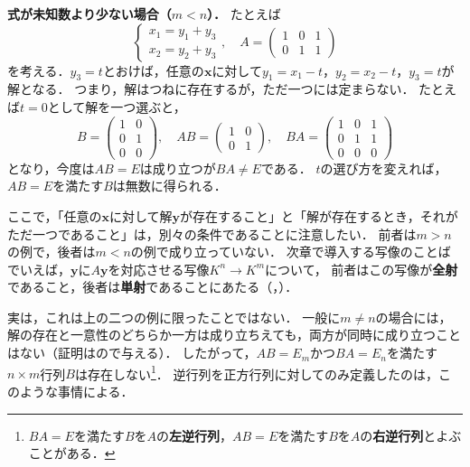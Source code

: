 \begin{remark}[係数行列が正方行列でない場合]
  \textbf{式が未知数より少ない場合（$m < n$）．}
  たとえば
  \[
    \begin{cases}
      x_1 = y_1 + y_3 \\
      x_2 = y_2 + y_3
    \end{cases}, \quad
    A = \begin{pmatrix} 1 & 0 & 1 \\ 0 & 1 & 1 \end{pmatrix}
  \]
  を考える．$y_3 = t$とおけば，任意の$\bm{x}$に対して$y_1 = x_1 - t$，$y_2 = x_2 - t$，$y_3 = t$が解となる．
  つまり，解はつねに存在するが，ただ一つには定まらない．
  たとえば$t = 0$として解を一つ選ぶと，
  \[
    B = \begin{pmatrix} 1 & 0 \\ 0 & 1 \\ 0 & 0 \end{pmatrix}, \quad
    AB = \begin{pmatrix} 1 & 0 \\ 0 & 1 \end{pmatrix}, \quad
    BA = \begin{pmatrix} 1 & 0 & 1 \\ 0 & 1 & 1 \\ 0 & 0 & 0 \end{pmatrix}
  \]
  となり，今度は$AB = E$は成り立つが$BA \ne E$である．
  $t$の選び方を変えれば，$AB = E$を満たす$B$は無数に得られる．

  ここで，「任意の$\bm{x}$に対して解$\bm{y}$が存在すること」と「解が存在するとき，それがただ一つであること」は，別々の条件であることに注意したい．
  前者は$m > n$の例で，後者は$m < n$の例で成り立っていない．
  次章で導入する写像のことばでいえば，$\bm{y}$に$A\bm{y}$を対応させる写像$K^n \to K^m$について，
  前者はこの写像が\textbf{全射}であること，後者は\textbf{単射}であることにあたる（，）．

  実は，これは上の二つの例に限ったことではない．
  一般に$m \ne n$の場合には，解の存在と一意性のどちらか一方は成り立ちえても，両方が同時に成り立つことはない（証明はので与える）．
  したがって，$AB = E_m$かつ$BA = E_n$を満たす$n \times m$行列$B$は存在しない\footnote{$BA = E$を満たす$B$を$A$の\textbf{左逆行列}，$AB = E$を満たす$B$を$A$の\textbf{右逆行列}とよぶことがある．}．
  逆行列を正方行列に対してのみ定義したのは，このような事情による．
\end{remark}

